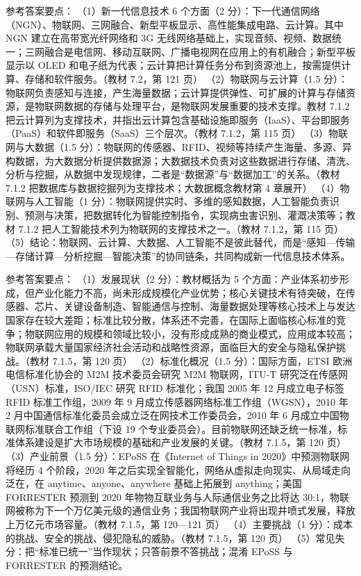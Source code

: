 \documentclass[a4paper,11pt]{article}
\begin{document}
\q 参考答案要点：
（1）新一代信息技术 6 个方面（2 分）：下一代通信网络（NGN）、物联网、三网融合、新型平板显示、高性能集成电路、云计算。其中 NGN 建立在高带宽光纤网络和 3G 无线网络基础上，实现音频、视频、数据统一；三网融合是电信网、移动互联网、广播电视网在应用上的有机融合；新型平板显示以 OLED 和电子纸为代表；云计算把计算任务分布到资源池上，按需提供计算、存储和软件服务。（教材 7.2，第 121 页）
（2）物联网与云计算（1.5 分）：物联网负责感知与连接，产生海量数据；云计算提供弹性、可扩展的计算与存储资源，是物联网数据的存储与处理平台，是物联网发展重要的技术支撑。教材 7.1.2 把云计算列为支撑技术，并指出云计算包含基础设施即服务（IaaS）、平台即服务（PaaS）和软件即服务（SaaS）三个层次。（教材 7.1.2，第 115 页）
（3）物联网与大数据（1.5 分）：物联网的传感器、RFID、视频等持续产生海量、多源、异构数据，为大数据分析提供数据源；大数据技术负责对这些数据进行存储、清洗、分析与挖掘，从数据中发现规律，二者是“数据源”与“数据加工”的关系。（教材 7.1.2 把数据库与数据挖掘列为支撑技术；大数据概念教材第 4 章展开）
（4）物联网与人工智能（1 分）：物联网提供实时、多维的感知数据，人工智能负责识别、预测与决策，把数据转化为智能控制指令，实现病虫害识别、灌溉决策等；教材 7.1.2 把人工智能技术列为物联网的支撑技术之一。（教材 7.1.2，第 115 页）
（5）结论：物联网、云计算、大数据、人工智能不是彼此替代，而是“感知—传输—存储计算—分析挖掘—智能决策”的协同链条，共同构成新一代信息技术体系。

\q 参考答案要点：
（1）发展现状（2 分）：教材概括为 5 个方面：产业体系初步形成，但产业化能力不高，尚未形成规模化产业优势；核心关键技术有待突破，在传感器、芯片、关键设备制造、智能通信与控制、海量数据处理等核心技术上与发达国家存在较大差距；标准比较分散，体系还不完善，在国际上面临核心标准的竞争；物联网应用的规模和领域比较小，没有形成成熟的商业模式，应用成本较高；物联网承载大量国家经济社会活动和战略性资源，面临巨大的安全与隐私保护挑战。（教材 7.1.5，第 120 页）
（2）标准化概况（1.5 分）：国际方面，ETSI 欧洲电信标准化协会的 M2M 技术委员会研究 M2M 物联网，ITU-T 研究泛在传感网（USN）标准，ISO/IEC 研究 RFID 标准化；我国 2005 年 12 月成立电子标签 RFID 标准工作组，2009 年 9 月成立传感器网络标准工作组（WGSN），2010 年 2 月中国通信标准化委员会成立泛在网技术工作委员会，2010 年 6 月成立中国物联网标准联合工作组（下设 19 个专业委员会）。目前物联网还缺乏统一标准，标准体系建设是扩大市场规模的基础和产业发展的关键。（教材 7.1.5，第 120 页）
（3）产业前景（1.5 分）：EPoSS 在《Internet of Things in 2020》中预测物联网将经历 4 个阶段，2020 年之后实现全智能化，网络从虚拟走向现实、从局域走向泛在，在 anytime、anyone、anywhere 基础上拓展到 anything；美国 FORRESTER 预测到 2020 年物物互联业务与人际通信业务之比将达 30:1，物联网被称为下一个万亿美元级的通信业务；我国物联网产业将出现井喷式发展，释放上万亿元市场容量。（教材 7.1.5，第 120—121 页）
（4）主要挑战（1 分）：成本的挑战、安全的挑战、侵犯隐私的威胁。（教材 7.1.5，第 120 页）
（5）常见失分：把“标准已统一”当作现状；只答前景不答挑战；混淆 EPoSS 与 FORRESTER 的预测结论。
\end{document}
